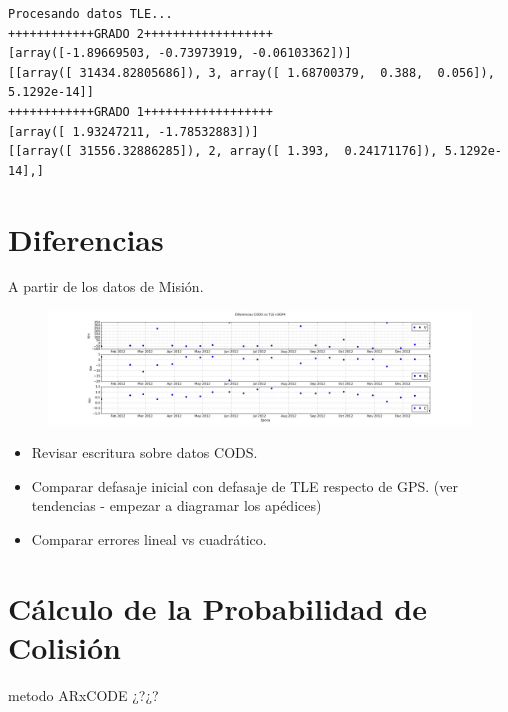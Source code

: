 \begin{verbatim}
Procesando datos TLE...
++++++++++++GRADO 2++++++++++++++++++
[array([-1.89669503, -0.73973919, -0.06103362])]
[[array([ 31434.82805686]), 3, array([ 1.68700379,  0.388,  0.056]), 5.1292e-14]]
++++++++++++GRADO 1++++++++++++++++++
[array([ 1.93247211, -1.78532883])]
[[array([ 31556.32886285]), 2, array([ 1.393,  0.24171176]), 5.1292e-14],]
\end{verbatim}

% 


\section*{Diferencias}
A partir de los datos de Misión. 

\begin{figure}[!h]
  \centering
  \includegraphics[width=\textwidth]{imagenes/sesgoTLE}
\end{figure}

\begin{itemize}
 \item Revisar escritura sobre datos CODS.
 \item Comparar defasaje inicial con defasaje de TLE respecto de GPS. (ver tendencias - empezar a diagramar los apédices)
 \item Comparar errores lineal vs cuadr\'atico.
\end{itemize}

\section{C\'alculo de la Probabilidad de Colisi\'on}
metodo ARxCODE ¿?¿?
